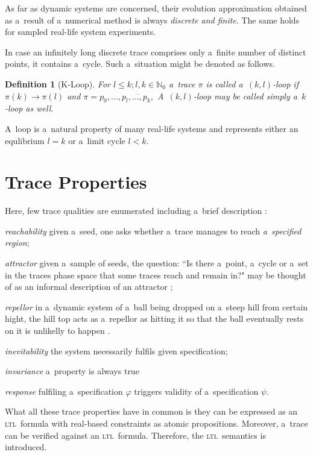 \documentclass[12pt,oneside,draft]{fithesis}
\newcommand{\ltl}{\textsc{ltl}~}
\newcommand{\mNatural}{\mathbb{N}}
\newtheorem{mydef}{Definition}
\begin{document}
As far as dynamic systems are concerned, their evolution approximation
obtained as a~result of a~numerical method is always \emph{discrete and
finite}. The same holds for sampled real-life system experiments.

In case an infinitely long discrete trace comprises only a~finite number
of distinct points, it contains a~cycle. Such a~situation might be
denoted as follows\cite{biere}.
\begin{mydef}[K-Loop]
For $l\leq k;l,k\in\mNatural_0$ a~trace $\pi$ is called a~$(k,l)$-loop
if $\pi(k)\rightarrow\pi(l)$ and
$\pi=p_0,\dotsc,\overline{p_{l},\dotsc,p_{k},}$
A~$(k,l)$-loop may be called simply a~$k$-loop as well. 
\end{mydef}
A~loop is a~natural property of many real-life systems and represents
either an equlibrium $l=k$ or a~limit
cycle $l<k$\cite{sven}.

\section{Trace Properties}
Here, few trace qualities are enumerated including a~brief
description \cite{sven}\cite{rizk}:
\begin{inparaenum}
	\item\emph{reachability} given a~seed, one asks whether a~trace
		manages to reach \emph{a~specified region};
	\item\emph{attractor} given a~sample of seeds, the question:
		``Is there a~point, a~cycle or a~set in the traces phase space
		that some traces reach and remain in?" may be thought of as an
		informal description of an attractor \cite{wiki-atractor};
	\item\emph{repellor} in a~dynamic system of a~ball being dropped on
		a~steep hill from certain hight, the hill top acts as a~repellor
		as hitting it so that the ball eventually rests on it is
		unlikelly to happen \cite{wiki-repellor}.
	\item\emph{inevitability} the system necessarily fulfils given
		specification;
	\item\emph{invariance} a~property is always true
	\item\emph{response} fulfiling a~specification $\varphi$ triggers
		validity of a~specification $\psi$.
\end{inparaenum}

What all these trace properties have in common is they can be expressed
as an \ltl formula with real-based constraints as atomic
propositions\cite{sven}. Moreover, a~trace can be verified against
an \ltl formula. Therefore, the \ltl semantics is introduced.
\end{document}
